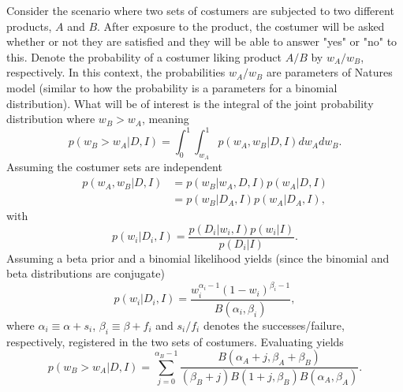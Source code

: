 \begin{example}
	Consider the scenario where two sets of costumers are subjected to two different products, $A$ and $B$. After exposure to the product, the costumer will be asked whether or not they are satisfied and they will be able to answer "yes" or "no" to this. Denote the probability of a costumer liking product $A/B$ by $w_A/w_B$, respectively. In this context, the probabilities $w_A/w_B$ are parameters of Natures model (similar to how the probability is a parameters for a binomial distribution). What will be of interest is the integral of the joint probability distribution where $w_B>w_A$, meaning
	\begin{equation}
		p(w_B > w_A|D,I)= \int_0^1\int_{w_A}^1p(w_A,w_B|D,I)dw_Adw_B.
		\label{e1}
	\end{equation}
	Assuming the costumer sets are independent
	\begin{equation}
		\begin{split}
			p(w_A,w_B|D,I) &= p(w_B|w_A,D,I)p(w_A|D,I)\\
			& = p(w_B|D_A,I)p(w_A|D_A,I),
		\end{split}
	\end{equation}
	with
	\begin{equation}
		p(w_i|D_i,I)=\frac{p(D_i|w_i,I)p(w_i|I)}{p(D_i|I)}.
	\end{equation}
	Assuming a beta prior and a binomial likelihood yields (since the binomial and beta distributions are conjugate)
	\begin{equation}
		p(w_i|D_i,I)=\frac{w_i^{\alpha_i-1}(1-w_i)^{\beta_i-1}}{B(\alpha_i,\beta_i)},
	\end{equation}
	where $\alpha_i\equiv \alpha+s_i$, $\beta_i\equiv \beta+f_i$ and $s_i/f_i$ denotes the successes/failure, respectively, registered in the two sets of costumers. Evaluating  yields
	\begin{equation}
		p(w_B > w_A|D,I)= \sum_{j=0}^{\alpha_B-1}\frac{B(\alpha_A+j,\beta_A+\beta_B)}{(\beta_B+j)B(1+j,\beta_B)B(\alpha_A,\beta_A)}.
	\end{equation}
	
\end{example}



